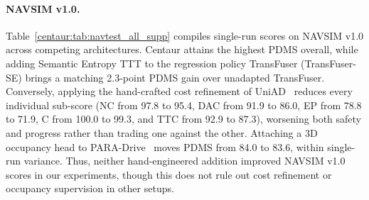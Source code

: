 \paragraph{NAVSIM v1.0.} Table~\ref{centaur:tab:navtest_all_supp} compiles single-run scores on NAVSIM v1.0 across competing architectures. Centaur attains the highest PDMS overall, while adding Semantic Entropy TTT to the regression policy TransFuser (TransFuser-SE) brings a matching 2.3-point PDMS gain over unadapted TransFuser. Conversely, applying the hand-crafted cost refinement of UniAD~\cite{hu2023uniad} reduces every individual sub-score (NC from 97.8 to 95.4, DAC from 91.9 to 86.0, EP from 78.8 to 71.9, C from 100.0 to 99.3, and TTC from 92.9 to 87.3), worsening both safety and progress rather than trading one against the other. Attaching a 3D occupancy head to PARA-Drive~\cite{weng2024paradrive} moves PDMS from 84.0 to 83.6, within single-run variance. Thus, neither hand-engineered addition improved NAVSIM v1.0 scores in our experiments, though this does not rule out cost refinement or occupancy supervision in other setups.

